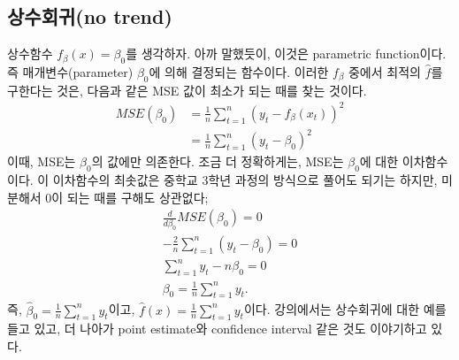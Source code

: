 \documentclass{article}
\begin{document}
\subsection{상수회귀(no trend)}
상수함수 \(f_\beta(x)=\beta_0\)를 생각하자.
아까 말했듯이, 이것은 parametric function이다.
즉 매개변수(parameter) \(\beta_0\)에 의해 결정되는 함수이다.
이러한 \(f_\beta\) 중에서 최적의 \(\hat f\)를 구한다는 것은, 다음과 같은 MSE 값이 최소가 되는 때를 찾는 것이다.
\begin{align*}
MSE(\beta_0)
& = \frac1n\sum_{t=1}^n(y_t-f_\beta(x_t))^2\\
& = \frac1n\sum_{t=1}^n(y_t-\beta_0)^2
\end{align*}
이때, MSE는 \(\beta_0\)의 값에만 의존한다.
조금 더 정확하게는, MSE는 \(\beta_0\)에 대한 이차함수이다.
이 이차함수의 최솟값은 중학교 3학년 과정의 방식으로 풀어도 되기는 하지만, 미분해서 0이 되는 때를 구해도 상관없다;
\begin{gather*}
\frac{d}{d\beta_0}MSE(\beta_0)=0\\
-\frac2n\sum_{t=1}^n(y_t-\beta_0)=0\\
\sum_{t=1}^ny_t-n\beta_0=0\\
\beta_0=\frac1n\sum_{t=1}^ny_t.
\end{gather*}
즉, \(\hat\beta_0=\frac1n\sum_{t=1}^ny_t\)이고, \(\hat f(x)=\frac1n\sum_{t=1}^ny_t\)이다.
강의에서는 상수회귀에 대한 예를 들고 있고, 더 나아가 point estimate와 confidence interval 같은 것도 이야기하고 있다.

\end{document}
